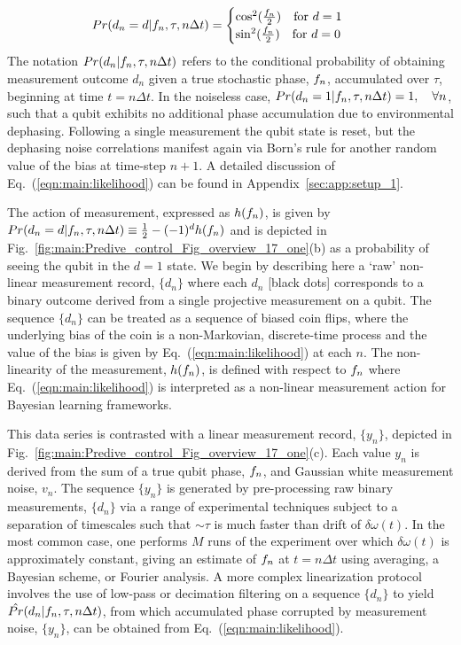 \begin{align}
	Pr(d_n=d | f_n, \tau, n \Delta t) &= \begin{cases} \cos^2(\frac{f_{n}}{2}) \quad \text{for $d=1$} \\   \sin^2(\frac{f_{n}}{2})  \quad \text{for $ d=0$}  \end{cases} \label{eqn:main:likelihood} 
\end{align}
The notation $Pr(d_n | f_n, \tau, n \Delta t)$ refers to the conditional probability of obtaining measurement outcome $d_n$ given a true stochastic phase, $f_n$, accumulated over $\tau$, beginning at time $t = n \Delta t$. In the noiseless case, $Pr(d_n=1|f_n, \tau, n \Delta t) = 1, \quad \forall n $, such that a qubit exhibits no additional phase accumulation due to environmental dephasing. Following a single measurement the qubit state is reset, but the dephasing noise correlations manifest again via Born's rule for another random value of the bias at time-step $n+1$. A detailed discussion of Eq.~(\ref {eqn:main:likelihood}) can be found in Appendix~\ref{sec:app:setup_1}.

The action of measurement, expressed as $h(f_n)$, is given by $Pr(d_n=d| f_n, \tau, n \Delta t) \equiv \frac{1}{2} - (-1)^d h(f_n) $ and is depicted in Fig.~\ref{fig:main:Predive_control_Fig_overview_17_one}(b) as a probability of seeing the qubit in the $d=1$ state.  We begin by describing here a `raw' non-linear measurement record, $\{ d_n\}$ where each $d_n$ [black dots] corresponds to a binary outcome derived from a single projective measurement on a qubit. The sequence $\{ d_n\}$ can be treated as a sequence of biased coin flips, where the underlying bias of the coin is a non-Markovian, discrete-time process and the value of the bias is given by Eq.~(\ref {eqn:main:likelihood}) at each $n$. The non-linearity of the measurement, $h(f_n)$, is defined with respect to $f_n$ where Eq.~(\ref {eqn:main:likelihood}) is interpreted as a non-linear measurement action for Bayesian learning frameworks.

This data series is contrasted with a linear measurement record, $\{ y_n\}$, depicted in Fig.~\ref{fig:main:Predive_control_Fig_overview_17_one}(c).  Each value $y_n$ is derived from the sum of a true qubit phase, $f_n$, and Gaussian white measurement noise, $v_n$.  The sequence $\{ y_n\}$ is generated by pre-processing raw binary measurements, $\{ d_n\}$ via a range of experimental techniques subject to a separation of timescales such that $\sim\tau$ is much faster than drift of $\delta \omega (t)$.  In the most common case, one performs $M$ runs of the experiment over which $\delta \omega (t)$ is approximately constant, giving an estimate of  $f_n$ at $t = n \Delta t $ using averaging, a Bayesian scheme, or Fourier analysis. A more complex linearization protocol involves the use of low-pass or decimation filtering on a sequence $\{ d_n\}$  to yield $\hat{Pr}(d_n | f_n, \tau, n\Delta t)$, from which accumulated phase corrupted by measurement noise, $\{ y_n\}$, can be obtained from Eq.~(\ref {eqn:main:likelihood}). 

